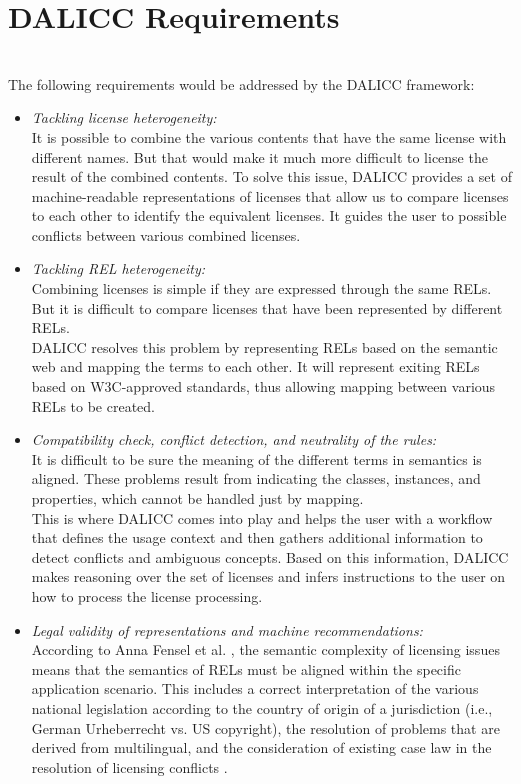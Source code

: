 \section{DALICC Requirements}
\\
The following requirements would be addressed by the DALICC framework: \\
\begin{itemize}
\item \textit{Tackling license heterogeneity:} \\
It is possible to combine the various contents that have the same license with different names. But that would make it much more difficult to license the result of the combined contents. To solve this issue, DALICC provides a set of machine-readable representations of licenses that allow us to compare licenses to each other to identify the equivalent licenses. It guides the user to possible conflicts between various combined licenses.
\item \textit{Tackling REL heterogeneity:} \\
Combining licenses is simple if they are expressed through the same RELs. But it is difficult to compare licenses that have been represented by different RELs. \\
DALICC resolves this problem by representing RELs based on the semantic web and mapping the terms to each other. It will represent exiting RELs based on W3C-approved standards, thus allowing mapping between various RELs to be created.
\item \textit{Compatibility check, conflict detection, and neutrality of the rules:} \\
It is difficult to be sure the meaning of the different terms in semantics is aligned. These problems result from indicating the classes, instances, and properties, which cannot be handled just by mapping. \\
This is where DALICC comes into play and helps the user with a workflow that defines the usage context and then gathers additional information to detect conflicts and ambiguous concepts. Based on this information, DALICC makes reasoning over the set of licenses and infers instructions to the user on how to process the license processing. \\
\item \textit{Legal validity of representations and machine recommendations:} \\
According to Anna Fensel et al. \cite{Anna}, the semantic complexity of licensing issues means that the semantics of RELs must be aligned within the specific application scenario. This includes a correct interpretation of the various national legislation according to the country of origin of a jurisdiction (i.e., German Urheberrecht vs. US copyright), the resolution of problems that are derived from multilingual, and the consideration of existing case law in the resolution of licensing conflicts \cite{Anna}.\\

\end{itemize}
